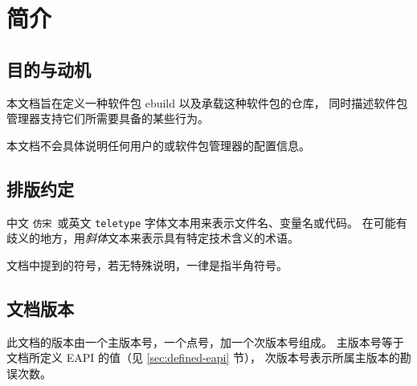 \chapter{简介}

\section{目的与动机}

本文档旨在定义一种软件包 ebuild 以及承载这种软件包的仓库，
同时描述软件包管理器支持它们所需要具备的某些行为。

本文档不会具体说明任何用户的或软件包管理器的配置信息。

\section{排版约定}

中文 \texttt{仿宋}\ 或英文 \texttt{teletype} 字体文本用来表示文件名、变量名或代码。
在可能有歧义的地方，用\textit{斜体}文本来表示具有特定技术含义的术语。

文档中提到的符号，若无特殊说明，一律是指半角符号。

\section{文档版本}

此文档的版本由一个主版本号，一个点号，加一个次版本号组成。
主版本号等于文档所定义 EAPI 的值（见 \ref{sec:defined-eapi} 节），
次版本号表示所属主版本的勘误次数。


